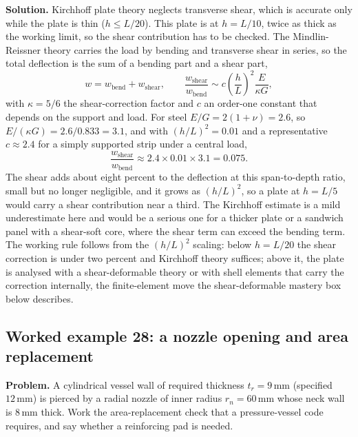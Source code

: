 \textbf{Solution.} Kirchhoff plate theory neglects transverse shear, which
is accurate only while the plate is thin ($h \le L/20$). This plate is at
$h = L/10$, twice as thick as the working limit, so the shear contribution
has to be checked. The Mindlin-Reissner theory carries the load by bending
and transverse shear in series, so the total deflection is the sum of a
bending part and a shear part,
\[
w = w_{\text{bend}} + w_{\text{shear}},
\qquad
\frac{w_{\text{shear}}}{w_{\text{bend}}} \sim
c\left(\frac{h}{L}\right)^2\frac{E}{\kappa G},
\]
with $\kappa = 5/6$ the shear-correction factor and $c$ an order-one
constant that depends on the support and load. For steel $E/G = 2(1+\nu) =
2.6$, so $E/(\kappa G) = 2.6/0.833 = 3.1$, and with $(h/L)^2 = 0.01$ and a
representative $c \approx 2.4$ for a simply supported strip under a central
load,
\[
\frac{w_{\text{shear}}}{w_{\text{bend}}} \approx 2.4\times 0.01\times 3.1
= 0.075.
\]
The shear adds about eight percent to the deflection at this span-to-depth
ratio, small but no longer negligible, and it grows as $(h/L)^2$, so a plate
at $h = L/5$ would carry a shear contribution near a third. The Kirchhoff
estimate is a mild underestimate here and would be a serious one for a
thicker plate or a sandwich panel with a shear-soft core, where the shear
term can exceed the bending term. The working rule follows from the
$(h/L)^2$ scaling: below $h = L/20$ the shear correction is under two
percent and Kirchhoff theory suffices; above it, the plate is analysed with
a shear-deformable theory or with shell elements that carry the correction
internally, the finite-element move the shear-deformable mastery box below
describes.

\subsection*{Worked example 28: a nozzle opening and area replacement}

\textbf{Problem.} A cylindrical vessel wall of required thickness $t_r =
9\,\si{\milli\meter}$ (specified $12\,\si{\milli\meter}$) is pierced by a
radial nozzle of inner radius $r_n = 60\,\si{\milli\meter}$ whose neck wall
is $8\,\si{\milli\meter}$ thick. Work the area-replacement check that a
pressure-vessel code requires, and say whether a reinforcing pad is needed.


